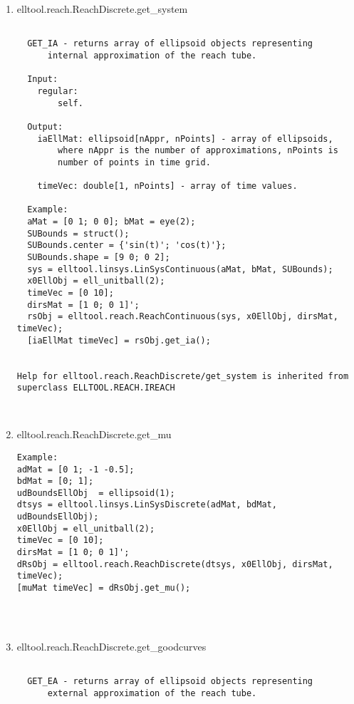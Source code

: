 \begin{enumerate}
\begin{lstlisting}
\end{lstlisting}
\fontfamily{\familydefault}
\selectfont
\item {elltool.reach.ReachDiscrete.get\_system}
\selectfont
\begin{lstlisting}

  GET_IA - returns array of ellipsoid objects representing
      internal approximation of the reach tube.

  Input:
    regular:
        self.

  Output:
    iaEllMat: ellipsoid[nAppr, nPoints] - array of ellipsoids,
        where nAppr is the number of approximations, nPoints is
        number of points in time grid.

    timeVec: double[1, nPoints] - array of time values.

  Example:
  aMat = [0 1; 0 0]; bMat = eye(2);
  SUBounds = struct();
  SUBounds.center = {'sin(t)'; 'cos(t)'};
  SUBounds.shape = [9 0; 0 2];
  sys = elltool.linsys.LinSysContinuous(aMat, bMat, SUBounds);
  x0EllObj = ell_unitball(2);
  timeVec = [0 10];
  dirsMat = [1 0; 0 1]';
  rsObj = elltool.reach.ReachContinuous(sys, x0EllObj, dirsMat, timeVec);
  [iaEllMat timeVec] = rsObj.get_ia();


Help for elltool.reach.ReachDiscrete/get_system is inherited from superclass ELLTOOL.REACH.IREACH



\end{lstlisting}
\fontfamily{\familydefault}
\selectfont
\item {elltool.reach.ReachDiscrete.get\_mu}
\selectfont
\begin{lstlisting}
Example:
adMat = [0 1; -1 -0.5];
bdMat = [0; 1];
udBoundsEllObj  = ellipsoid(1);
dtsys = elltool.linsys.LinSysDiscrete(adMat, bdMat, udBoundsEllObj);
x0EllObj = ell_unitball(2);
timeVec = [0 10];
dirsMat = [1 0; 0 1]';
dRsObj = elltool.reach.ReachDiscrete(dtsys, x0EllObj, dirsMat, timeVec);
[muMat timeVec] = dRsObj.get_mu();




\end{lstlisting}
\fontfamily{\familydefault}
\selectfont
\item {elltool.reach.ReachDiscrete.get\_goodcurves}
\selectfont
\begin{lstlisting}

  GET_EA - returns array of ellipsoid objects representing
      external approximation of the reach tube.


\end{lstlisting}
\end{enumerate}
